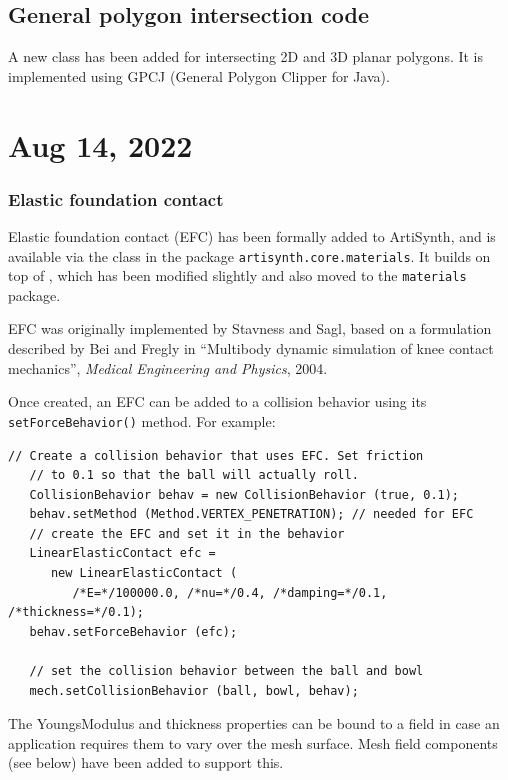 \documentclass{article}
\begin{document}
\subsection*{General polygon intersection code}

A new class  has
been added for intersecting 2D and 3D planar polygons. It is
implemented using GPCJ (General Polygon Clipper for Java).

\section*{Aug 14, 2022}

\subsubsection{Elastic foundation contact}

Elastic foundation contact (EFC) has been formally added to ArtiSynth, and
is available via the class
 in the
package {\tt artisynth.core.materials}. It builds on top of
, which has
been modified slightly and also moved to the {\tt materials} package.

EFC was originally implemented by Stavness and Sagl, based on a
formulation described by Bei and Fregly in ``Multibody dynamic
simulation of knee contact mechanics'', {\it Medical Engineering and
Physics}, 2004.

Once created, an EFC can be added to a collision behavior using its
{\tt setForceBehavior()} method. For example:
%
\begin{lstlisting}[]
   // Create a collision behavior that uses EFC. Set friction
   // to 0.1 so that the ball will actually roll.
   CollisionBehavior behav = new CollisionBehavior (true, 0.1);
   behav.setMethod (Method.VERTEX_PENETRATION); // needed for EFC
   // create the EFC and set it in the behavior
   LinearElasticContact efc =
      new LinearElasticContact (
         /*E=*/100000.0, /*nu=*/0.4, /*damping=*/0.1, /*thickness=*/0.1);
   behav.setForceBehavior (efc);

   // set the collision behavior between the ball and bowl
   mech.setCollisionBehavior (ball, bowl, behav);
\end{lstlisting}
%
The {\sf YoungsModulus} and {\sf thickness} properties can be bound to
a field in case an application requires them to vary over the mesh
surface. Mesh field components (see below) have been added to support
this.
\end{document}
